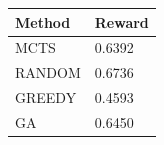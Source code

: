 \begin{tabular}{ll}
\hline
Method & Reward \\
\hline
  MCTS & 0.6392 \\
  RANDOM & 0.6736 \\
  GREEDY & 0.4593 \\
  GA & 0.6450 \\
\hline
\end{tabular}
